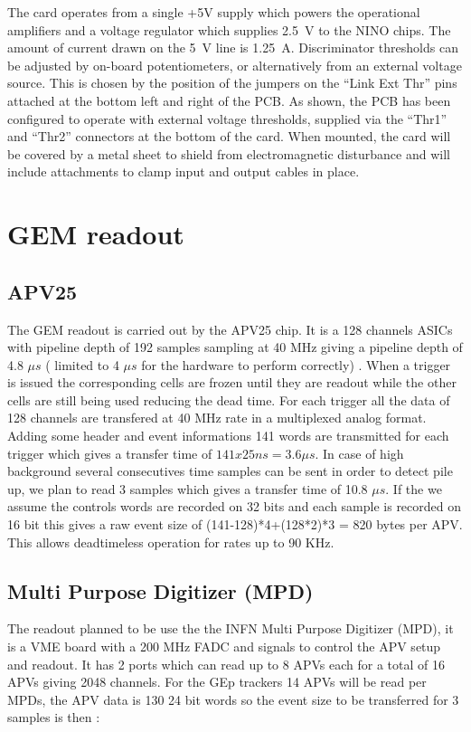 \documentclass{article}
\begin{document}
The card operates from a single +5V supply which powers the operational
amplifiers and a voltage regulator which supplies 2.5~V to the NINO
chips. The amount of current drawn on the 5~V line is 1.25~A. Discriminator
thresholds can be adjusted by on-board potentiometers, or alternatively
from an external voltage source. This is chosen by the position of
the jumpers on the ``Link Ext Thr'' pins attached at the bottom
left and right of the PCB. As shown, the PCB has been configured to
operate with external voltage thresholds, supplied via the ``Thr1''
and ``Thr2'' connectors at the bottom of the card. When mounted,
the card will be covered by a metal sheet to shield from electromagnetic
disturbance and will include attachments to clamp input and output
cables in place.

\section{GEM readout}
\subsection{APV25}
The GEM readout is carried out by the APV25 chip. It is a 128 channels ASICs with pipeline depth of 192 samples sampling at 40 MHz giving a pipeline depth of 4.8 $\mu s$ ( limited to 4 $\mu s$ for the hardware to perform correctly) . When a trigger is issued the corresponding cells are frozen until they are readout while the other cells are still being used reducing the dead time.
For each trigger all the data of 128 channels are transfered at 40 MHz rate in a multiplexed analog format. Adding some header and event informations 141 words are transmitted for each trigger which gives a transfer time of $141x25 ns = 3.6 \mu s $. In case of high background several consecutives time samples can be sent in order to detect pile up, we plan to read 3 samples which gives a transfer time of 10.8 $\mu s$. If the we assume the controls words are recorded on 32 bits and each sample is recorded on 16 bit this gives a raw event size of (141-128)*4+(128*2)*3 = 820 bytes per APV. This allows deadtimeless operation for rates up to 90 KHz.

\subsection {Multi Purpose Digitizer (MPD)}
 The readout planned to be use the the INFN Multi Purpose Digitizer (MPD), it is a VME board with a 200 MHz FADC and signals to control the APV setup and readout. It has 2 ports which can read up to 8 APVs each for a total of 16 APVs giving 2048 channels. 
For the GEp trackers 14 APVs will be read per MPDs, the APV data is 130 24 bit words so the event size to be transferred for 3 samples is then :
\end{document}
